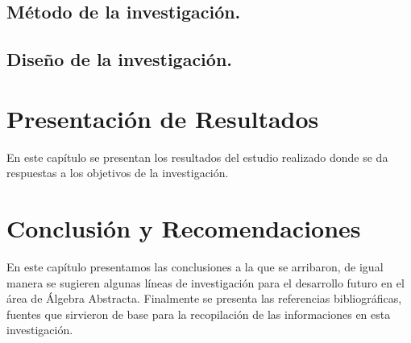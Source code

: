 \documentclass[12pt]{book}
\begin{document}
\section{Método de la investigación.}




\section{Diseño de la investigación.}





\chapter{Presentación de Resultados}





En este capítulo se presentan los resultados del estudio realizado donde
se da respuestas a los objetivos de la investigación.\\

\chapter{Conclusión y Recomendaciones}

En este capítulo presentamos las conclusiones a la que se arribaron, de igual manera se sugieren algunas líneas de investigación para el desarrollo futuro en el área de Álgebra Abstracta. Finalmente se presenta las referencias bibliográficas, fuentes que sirvieron de base para la recopilación de las informaciones en esta investigación.
\end{document}
